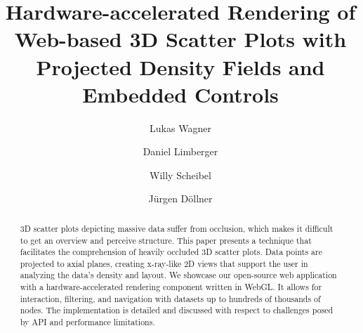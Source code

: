 \documentclass[sigconf]{acmart}
\begin{document}
\title[Hardware-accelerated Rendering of Web-based 3D Scatter Plots with Projected Density Fields]{Hardware-accelerated Rendering of Web-based 3D Scatter Plots with Projected Density Fields and Embedded Controls}

\author{Lukas Wagner}

\author{Daniel Limberger}

\author{Willy Scheibel}

\author{J{\"u}rgen D{\"o}llner}

\renewcommand{\shortauthors}{Wagner et al.}

\begin{abstract}
    3D scatter plots depicting massive data suffer from occlusion, which makes it difficult to get an overview and perceive structure. 
    This paper presents a technique that facilitates the comprehension of heavily occluded 3D scatter plots. 
    Data points are projected to axial planes, creating x-ray-like 2D views that support the user in analyzing the data's density and layout.
    We showcase our open-source web application with a hardware-accelerated rendering component written in WebGL.
    It allows for interaction, filtering, and navigation with datasets up to hundreds of thousands of nodes.
    The implementation is detailed and discussed with respect to challenges posed by API and performance limitations.
\end{abstract}
\end{document}
